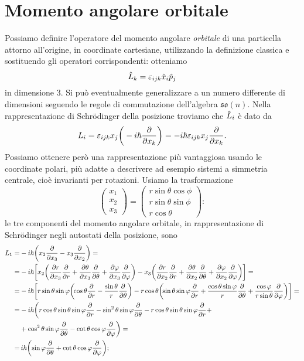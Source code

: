 \section{Momento angolare orbitale}
Possiamo definire l'operatore del momento angolare \emph{orbitale} di una particella attorno all'origine, in coordinate cartesiane, utilizzando la definizione classica e sostituendo gli operatori corrispondenti: otteniamo
\begin{equation}
	\hat{L}_k=\varepsilon_{ijk}\hat{x}_i\hat{p}_j
	\label{eq:momento-angolare-orbitale}
\end{equation}
in dimensione 3.
Si può eventualmente generalizzare a un numero differente di dimensioni seguendo le regole di commutazione dell'algebra $\mathfrak{so}(n)$.
Nella rappresentazione di Schr\"odinger della posizione troviamo che $\hat{L}_i$ è dato da
\begin{equation}
	L_i=\varepsilon_{ijk}x_j\bigg(-i\hbar\frac{\partial {}}{\partial {x_k}}\bigg)=-i\hbar\varepsilon_{ijk}x_j\frac{\partial {}}{\partial {x_k}}.
\end{equation}
Possiamo ottenere però una rappresentazione più vantaggiosa usando le coordinate polari, più adatte a descrivere ad esempio sistemi a simmetria centrale, cioè invarianti per rotazioni.
Usiamo la trasformazione
\begin{equation}
	\begin{pmatrix}
		x_1\\
		x_2\\
		x_3
	\end{pmatrix}
	=
	\begin{pmatrix}
		r\sin\theta\cos\phi\\
		r\sin\theta\sin\phi\\
		r\cos\theta
	\end{pmatrix}:
\end{equation}
le tre componenti del momento angolare orbitale, in rappresentazione di Schr\"odinger negli autostati della posizione, sono
\begin{equation}
	\begin{split}
		L_1=&-i\hbar\bigg(x_2\frac{\partial {}}{\partial {x_3}}-x_3\frac{\partial {}}{\partial {x_2}}\bigg)=\\
		=&-i\hbar\bigg[x_2\bigg(\frac{\partial {r}}{\partial {x_3}}\frac{\partial {}}{\partial {r}}+\frac{\partial {\theta}}{\partial {x_3}}\frac{\partial {}}{\partial {\theta}}+\frac{\partial {\varphi}}{\partial {x_3}}\frac{\partial {}}{\partial {\varphi}}\bigg)
			-x_3\bigg(\frac{\partial {r}}{\partial {x_2}}\frac{\partial {}}{\partial {r}}+\frac{\partial {\theta}}{\partial {x_2}}\frac{\partial {}}{\partial {\theta}}+\frac{\partial {\varphi}}{\partial {x_2}}\frac{\partial {}}{\partial {\varphi}}\bigg)\bigg]=\\
		=&-i\hbar\bigg[r\sin\theta\sin\varphi\bigg(\!\!\cos\theta\frac{\partial {}}{\partial {r}}-\frac{\sin\theta}{r}\frac{\partial {}}{\partial {\theta}}\bigg)
			-r\cos\theta\bigg(\!\!\sin\theta\sin\varphi\frac{\partial {}}{\partial {r}}+\frac{\cos\theta\sin\varphi}{r}\frac{\partial {}}{\partial {\theta}}+\frac{\cos\varphi}{r\sin\theta}\frac{\partial {}}{\partial {\varphi}}\bigg)\bigg]=\\
		=&-i\hbar\bigg(r\cos\theta\sin\theta\sin\varphi\frac{\partial {}}{\partial {r}}-\sin^2\theta\sin\varphi\frac{\partial {}}{\partial {\theta}}-r\cos\theta\sin\theta\sin\varphi\frac{\partial {}}{\partial {r}}+\\
			&+\cos^2\theta\sin\varphi\frac{\partial {}}{\partial {\theta}}-\cot\theta\cos\varphi\frac{\partial {}}{\partial {\varphi}}\bigg)=\\
		=&\,i\hbar\bigg(\!\sin\varphi\frac{\partial {}}{\partial {\theta}}+\cot\theta\cos\varphi\frac{\partial {}}{\partial {\varphi}}\bigg);
	\end{split}
	\label{eq:L_1-schroedinger}
\end{equation}
